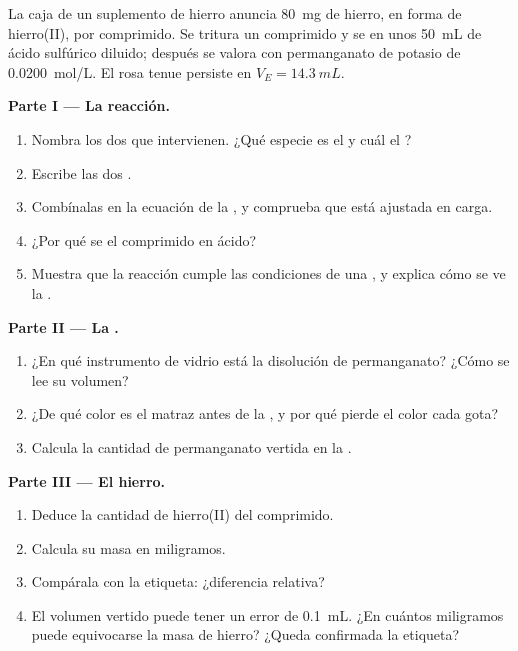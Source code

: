 \begin{problem}
\label{pb:g11:titration:1}
La caja de un suplemento de hierro anuncia \qty{80}{mg} de hierro, en
forma de hierro(II), por comprimido. Se tritura un comprimido y se
 en unos \qty{50}{mL} de ácido sulfúrico diluido; después se
valora con permanganato de potasio de \qty{0.0200}{mol/L}. El rosa tenue
persiste en $V_E = \qty{14.3}{mL}$.

\medskip
\noindent\textbf{Parte I --- La reacción.}
\begin{enumerate}
  \item Nombra los dos  que intervienen. ¿Qué especie es el
         y cuál el ?
  \item Escribe las dos .
  \item Combínalas en la ecuación de la , y comprueba que está
        ajustada en carga.
  \item ¿Por qué se  el comprimido en ácido?
  \item Muestra que la reacción cumple las condiciones de una ,
        y explica cómo se ve la .
\end{enumerate}

\medskip
\noindent\textbf{Parte II --- La .}
\begin{enumerate}[resume]
  \item ¿En qué instrumento de vidrio está la disolución de
        permanganato? ¿Cómo se lee su volumen?
  \item ¿De qué color es el matraz antes de la , y por qué
        pierde el color cada gota?
  \item Calcula la cantidad de permanganato vertida en la .
\end{enumerate}

\medskip
\noindent\textbf{Parte III --- El hierro.}
\begin{enumerate}[resume]
  \item Deduce la cantidad de hierro(II) del comprimido.
  \item Calcula su masa en miligramos.
  \item Compárala con la etiqueta: ¿diferencia relativa?
  \item El volumen vertido puede tener un error de \qty{0.1}{mL}. ¿En
        cuántos miligramos puede equivocarse la masa de hierro? ¿Queda
        confirmada la etiqueta?
\end{enumerate}


\end{problem}
